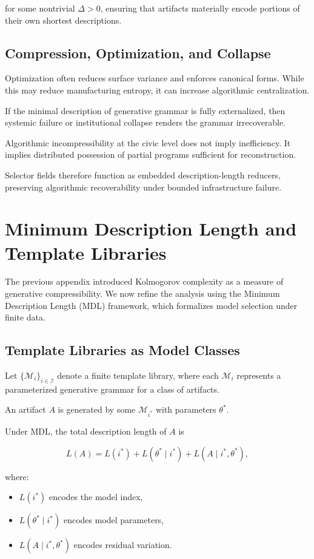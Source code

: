 \documentclass[11pt]{article}
\begin{document}
for some nontrivial $\Delta > 0$,
ensuring that artifacts materially encode portions of their own
shortest descriptions.

\subsection{Compression, Optimization, and Collapse}

Optimization often reduces surface variance and enforces canonical
forms. While this may reduce manufacturing entropy, it can increase
algorithmic centralization.

If the minimal description of generative grammar is fully externalized,
then systemic failure or institutional collapse renders the grammar
irrecoverable.

Algorithmic incompressibility at the civic level does not imply
inefficiency. It implies distributed possession of partial programs
sufficient for reconstruction.

Selector fields therefore function as embedded description-length
reducers, preserving algorithmic recoverability under bounded
infrastructure failure.

\section{Minimum Description Length and Template Libraries}

The previous appendix introduced Kolmogorov complexity as a
measure of generative compressibility. We now refine the analysis
using the Minimum Description Length (MDL) framework, which
formalizes model selection under finite data.

\subsection{Template Libraries as Model Classes}

Let $\{\mathcal{M}_i\}_{i \in \mathcal{I}}$ denote a finite
template library, where each $\mathcal{M}_i$ represents a
parameterized generative grammar for a class of artifacts.

An artifact $A$ is generated by some $\mathcal{M}_{i^*}$ with
parameters $\theta^*$.

Under MDL, the total description length of $A$ is

\[
L(A) = L(i^*) + L(\theta^* \mid i^*) + L(A \mid i^*, \theta^*),
\]

where:

\begin{itemize}
\item $L(i^*)$ encodes the model index,
\item $L(\theta^* \mid i^*)$ encodes model parameters,
\item $L(A \mid i^*, \theta^*)$ encodes residual variation.
\end{itemize}
\end{document}
